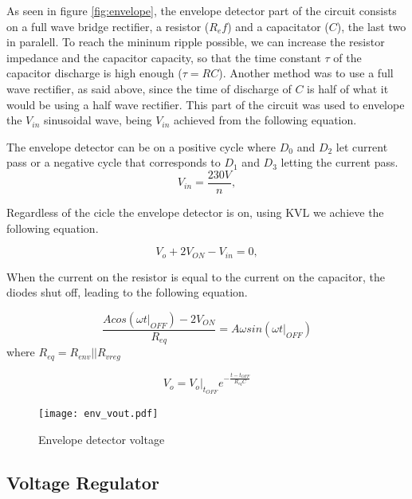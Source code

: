 As seen in figure \ref{fig:envelope}, the envelope detector part of the circuit consists on a full wave bridge rectifier, a resistor ($R_ef$) and a capacitator ($C$), the last two in paralell. To reach the mininum ripple possible, we can increase the resistor impedance and the capacitor capacity, so that the time constant $\tau$ of the capacitor discharge is high enough ($\tau=RC$). Another method was to use a full wave rectifier, as said above, since the time of discharge of $C$ is half of what it would be using a half wave rectifier. This part of the circuit was used to envelope the $V_{in}$ sinusoidal wave, being $V_{in}$ achieved from the following equation.

The envelope detector can be on a positive cycle where $D_0$ and $D_2$ let current pass or a negative cycle that corresponds to $D_1$ and $D_3$ letting the current pass.
\begin{equation}
  V_{in} = \frac{230V}{n},
  \label{eq:vin}
\end{equation}
 
Regardless of the cicle the envelope detector is on, using KVL we achieve the following equation.

\begin{equation}
    V_o + 2V_{ON} - V_{in} = 0,
 \label{eq:envelope2}  
\end{equation}

When the current on the resistor is equal to the current on the capacitor, the diodes shut off, leading to the following equation.


\begin{equation}
    \frac{Acos(\omega t|_{OFF})-2V_{ON}}{R_{eq}}=A\omega sin(\omega t|_{OFF})
\end{equation}
where $R_{eq}=R_{env}||R_{vreg}$

\begin{equation}
    V_o=V_o|_{t_{OFF}}e^{-\frac{t-t_{OFF}}{R_{eq}C}}
\end{equation}

\begin{figure}[!ht] \centering
\caption{Envelope detector voltage}
\squeezeup 
\squeezeup 
\squeezeup 
\squeezeup 
\squeezeup 
\squeezeup 
\squeezeup 
\squeezeup 
 
\texttt{[image: env\_vout.pdf]} %
\label{fig:gteo1}
\end{figure}
\newpage
\subsection{Voltage Regulator}
\label{sec:regulator}

